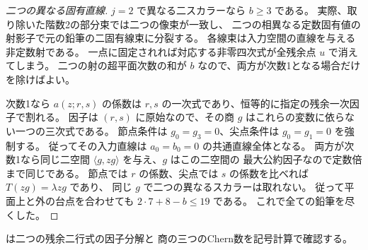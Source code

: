\begin{proof}[二つの異なる固有直線]
$j=2$ で異なる二スカラーなら $b\ge3$ である。
実際、取り除いた階数2の部分束では二つの像束が一致し、
二つの相異なる定数固有値の射影子で元の鉛筆の二固有線束に分裂する。
各線束は入力空間の直線を与える非定数射である。
一点に固定されれば対応する非零四次式が全残余点 $u$ で消えてしまう。
二つの射の超平面次数の和が $b$ なので、両方が次数1となる場合だけを除けばよい。

次数1なら $a(z;r,s)$ の係数は $r,s$ の一次式であり、恒等的に指定の残余一次因子で割れる。
因子は $(r,s)$ に原始なので、その商 $g$ はこれらの変数に依らない一つの三次式である。
節点条件は $g_0=g_3=0$、尖点条件は $g_0=g_1=0$ を強制する。
従ってその入力直線は $a_0=b_0=0$ の共通直線全体となる。
両方が次数1なら同じ二空間 $\langle g,z g\rangle$ を与え、$g$ はこの二空間の
最大公約因子なので定数倍まで同じである。
節点では $r$ の係数、尖点では $s$ の係数を比べれば $T(zg)=\lambda zg$ であり、
同じ $g$ で二つの異なるスカラーは取れない。
従って平面上と外の台点を合わせても $2\cdot7+8-b\le19$ である。
これで全ての鉛筆を尽くした。
\end{proof}

 は二つの残余二行式の因子分解と
商の三つのChern数を記号計算で確認する。
